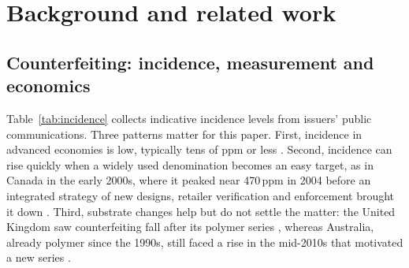\documentclass{article}
\theoremstyle{definition}
\theoremstyle{remark}
\begin{document}
\section{Background and related work}
\label{sec:related}

\subsection{Counterfeiting: incidence, measurement and economics}

Table~\ref{tab:incidence} collects indicative incidence levels from issuers' public communications. Three patterns matter for this paper. First, incidence in advanced economies is low, typically tens of ppm or less \citep{ecb_stats,fed_currency}. Second, incidence can rise quickly when a widely used denomination becomes an easy target, as in Canada in the early 2000s, where it peaked near 470\,ppm in 2004 before an integrated strategy of new designs, retailer verification and enforcement brought it down \citep{chant2004counterfeiting,boc_counterfeit}. Third, substrate changes help but do not settle the matter: the United Kingdom saw counterfeiting fall after its polymer series \citep{boe_counterfeit}, whereas Australia, already polymer since the 1990s, still faced a rise in the mid-2010s that motivated a new series \citep{rba_counterfeit}.
\end{document}
